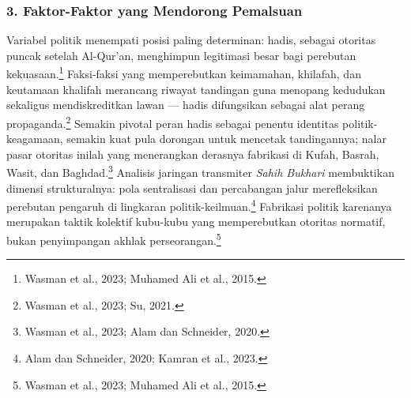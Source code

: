 \subsubsection*{3. Faktor-Faktor yang Mendorong Pemalsuan}

Variabel politik menempati posisi paling determinan: hadis, sebagai otoritas puncak setelah Al-Qur'an, menghimpun legitimasi besar bagi perebutan kekuasaan.\footnote{Wasman et al., 2023; Muhamed Ali et al., 2015.} Faksi-faksi yang memperebutkan keimamahan, khilafah, dan keutamaan khalifah merancang riwayat tandingan guna menopang kedudukan sekaligus mendiskreditkan lawan --- hadis difungsikan sebagai alat perang propaganda.\footnote{Wasman et al., 2023; Su, 2021.} Semakin pivotal peran hadis sebagai penentu identitas politik-keagamaan, semakin kuat pula dorongan untuk mencetak tandingannya; nalar pasar otoritas inilah yang menerangkan derasnya fabrikasi di Kufah, Basrah, Wasit, dan Baghdad.\footnote{Wasman et al., 2023; Alam dan Schneider, 2020.} Analisis jaringan transmiter \textit{Sahih Bukhari} membuktikan dimensi strukturalnya: pola sentralisasi dan percabangan jalur merefleksikan perebutan pengaruh di lingkaran politik-keilmuan.\footnote{Alam dan Schneider, 2020; Kamran et al., 2023.} Fabrikasi politik karenanya merupakan taktik kolektif kubu-kubu yang memperebutkan otoritas normatif, bukan penyimpangan akhlak perseorangan.\footnote{Wasman et al., 2023; Muhamed Ali et al., 2015.}

